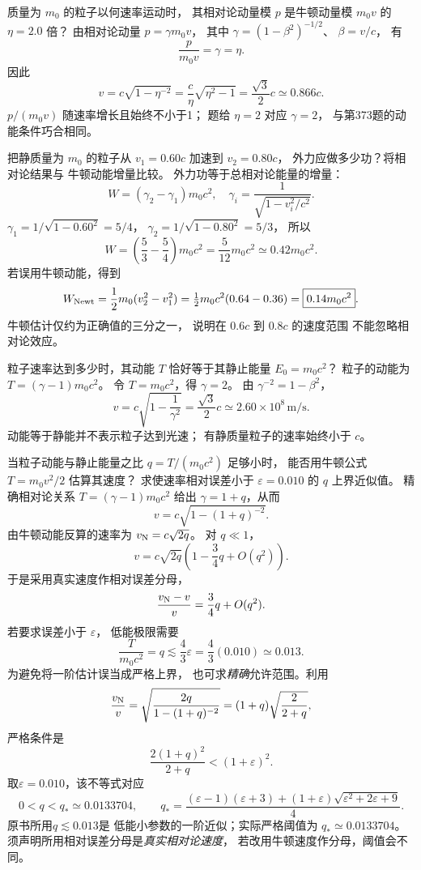 质量为 $m_0$ 的粒子以何速率运动时，
其相对论动量模 $p$ 是牛顿动量模
$m_0v$ 的 $\eta=2.0$ 倍？
\exsolution
由相对论动量
$p=\gamma m_0v$，
其中 $\gamma=(1-\beta^2)^{-1/2}$、
$\beta=v/c$，
有
\[
\frac{p}{m_0v}=\gamma=\eta.
\]
因此
\[
\boxed{v=c\sqrt{1-\eta^{-2}}
=\frac c\eta\sqrt{\eta^2-1}
=\frac{\sqrt3}{2}c\simeq0.866c}.
\]
\excheck $p/(m_0v)$ 随速率增长且始终不小于1；
题给 $\eta=2$ 对应 $\gamma=2$，
与第373题的动能条件巧合相同。

把静质量为 $m_0$ 的粒子从
$v_1=0.60c$ 加速到 $v_2=0.80c$，
外力应做多少功？将相对论结果与
牛顿动能增量比较。
\exsolution
外力功等于总相对论能量的增量：
\[
W=(\gamma_2-\gamma_1)m_0c^2,
\quad
\gamma_i=\frac1{\sqrt{1-v_i^2/c^2}}.
\]
$\gamma_1=1/\sqrt{1-0.60^2}=5/4$，
$\gamma_2=1/\sqrt{1-0.80^2}=5/3$，
所以
\[
\boxed{W=\left(\frac53-\frac54\right)m_0c^2
=\frac5{12}m_0c^2\simeq0.42m_0c^2}.
\]
若误用牛顿动能，得到
\[
W_{\rm Newt}=\frac12m_0(v_2^2-v_1^2)
=\tfrac12m_0c^2(0.64-0.36)
=\boxed{0.14m_0c^2}.
\]
\excheck 牛顿估计仅约为正确值的三分之一，
说明在 $0.6c$ 到 $0.8c$ 的速度范围
不能忽略相对论效应。

粒子速率达到多少时，其动能
$T$ 恰好等于其静止能量 $E_0=m_0c^2$？
\exsolution
粒子的动能为
$T=(\gamma-1)m_0c^2$。
令 $T=m_0c^2$，得 $\gamma=2$。
由
$\gamma^{-2}=1-\beta^2$，
\[
\boxed{v=c\sqrt{1-\frac1{\gamma^2}}
=\frac{\sqrt3}{2}c
\simeq2.60\times10^8\,\mathrm{m/s}}.
\]
\excheck 动能等于静能并不表示粒子达到光速；
有静质量粒子的速率始终小于 $c$。

当粒子动能与静止能量之比
$q=T/(m_0c^2)$ 足够小时，
能否用牛顿公式 $T=m_0v^2/2$ 估算其速度？
求使速率相对误差小于
$\varepsilon=0.010$ 的 $q$ 上界近似值。
\exsolution
精确相对论关系
$T=(\gamma-1)m_0c^2$
给出 $\gamma=1+q$，从而
\[
v=c\sqrt{1-(1+q)^{-2}}.
\]
由牛顿动能反算的速率为
$v_{\rm N}=c\sqrt{2q}$。
对 $q\ll1$，
\[
v=c\sqrt{2q}
\left(1-\frac34q+O(q^2)\right).
\]
于是采用真实速度作相对误差分母，
\[
\frac{v_{\rm N}-v}{v}
=\frac34q+O(q^2).
\]
若要求误差小于 $\varepsilon$，
低能极限需要
\[
\boxed{\frac{T}{m_0c^2}=q
\lesssim\frac43\varepsilon
=\frac43(0.010)
\simeq0.013}.
\]
为避免将一阶估计误当成严格上界，
也可求\emph{精确}允许范围。利用
\[
\frac{v_{\rm N}}{v}
=\sqrt{\frac{2q}{1-(1+q)^{-2}}}
=(1+q)\sqrt{\frac{2}{2+q}},
\]
严格条件是
\[
\boxed{\frac{2(1+q)^2}{2+q}<(1+\varepsilon)^2}.
\]
取$\varepsilon=0.010$，该不等式对应
\[
\boxed{0<q<q_* \simeq0.0133704},\qquad
q_*=\frac{(\varepsilon-1)(\varepsilon+3)
 +(1+\varepsilon)\sqrt{\varepsilon^2+2\varepsilon+9}}4.
\]
\excheck 原书所用$q\lesssim 0.013$是
低能小参数的一阶近似；实际严格阈值为
$q_*\simeq0.0133704$。
须声明所用相对误差分母是\emph{真实相对论速度}，
若改用牛顿速度作分母，阈值会不同。

